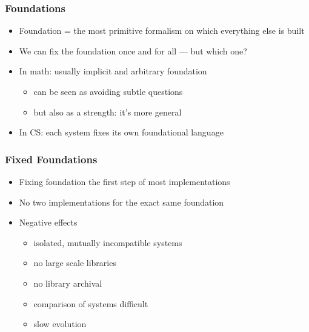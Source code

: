 \documentclass{beamer}
\begin{document}
\begin{frame}\frametitle{Foundations}
\begin{itemize}
  \item Foundation = the most primitive formalism on which everything else is built
  \item We can fix the foundation once and for all --- but which one?
  \bigskip
  
  \item In math: usually implicit and arbitrary foundation
    \begin{itemize}
      \item can be seen as avoiding subtle questions
      \item but also as a strength: it's more general
    \end{itemize}
  \item In CS: each system fixes its own foundational language
    \bigskip
\end{itemize}
\end{frame}

\begin{frame}\frametitle{Fixed Foundations}
\begin{itemize}
  \item Fixing foundation the first step of most implementations
  \item No two implementations for the exact same foundation
  \item Negative effects
    \begin{itemize}
     \item isolated, mutually incompatible systems \\
     \item no large scale libraries \\
     \item no library archival \\
     \item comparison of systems difficult \\
     \item slow evolution \\
    \end{itemize}
\end{itemize}
\end{frame}
\end{document}
